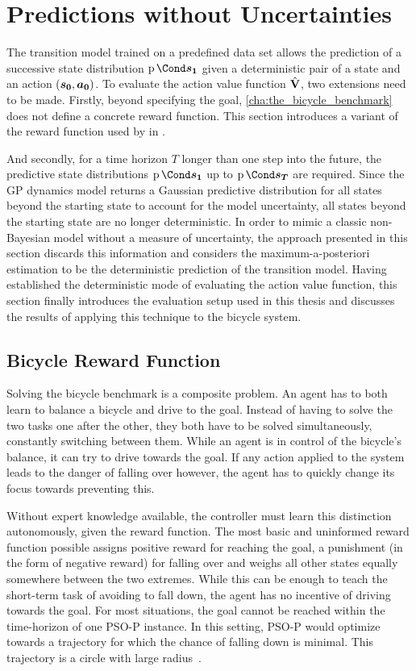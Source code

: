 \section{Predictions without Uncertainties}
The transition model trained on a predefined data set allows the prediction of a successive state distribution $\Prob{\mat{s_1}}$ given a deterministic pair of a state and an action $(\bm{s_0}, \bm{a_0})$.
To evaluate the action value function $\operatorname{\hat{\operatorname{\mathbf{V}}}}$, two extensions need to be made.
Firstly, beyond specifying the goal, \cref{cha:the_bicycle_benchmark} does not define a concrete reward function.
This section introduces a variant of the reward function used by \citeauthor{randlov_learning_1998} in \cite{randlov_learning_1998}.

And secondly, for a time horizon $T$ longer than one step into the future, the predictive state distributions $\Prob{\mat{s_1}}$ up to $\Prob{\mat{s_T}}$ are required.
Since the GP dynamics model returns a Gaussian predictive distribution for all states beyond the starting state to account for the model uncertainty, all states beyond the starting state are no longer deterministic.
In order to mimic a classic non-Bayesian model without a measure of uncertainty, the approach presented in this section discards this information and considers the maximum-a-posteriori estimation to be the deterministic prediction of the transition model.
Having established the deterministic mode of evaluating the action value function, this section finally introduces the evaluation setup used in this thesis and discusses the results of applying this technique to the bicycle system.

\subsection{Bicycle Reward Function}
\label{sub:reward_function}
Solving the bicycle benchmark is a composite problem.
An agent has to both learn to balance a bicycle and drive to the goal.
Instead of having to solve the two tasks one after the other, they both have to be solved simultaneously, constantly switching between them.
While an agent is in control of the bicycle's balance, it can try to drive towards the goal.
If any action applied to the system leads to the danger of falling over however, the agent has to quickly change its focus towards preventing this.

Without expert knowledge available, the controller must learn this distinction autonomously, given the reward function.
The most basic and uninformed reward function possible assigns positive reward for reaching the goal, a punishment (in the form of negative reward) for falling over and weighs all other states equally somewhere between the two extremes.
While this can be enough to teach the short-term task of avoiding to fall down, the agent has no incentive of driving towards the goal.
For most situations, the goal cannot be reached within the time-horizon of one PSO-P instance.
In this setting, PSO-P would optimize towards a trajectory for which the chance of falling down is minimal.
This trajectory is a circle with large radius~\cite{randlov_learning_1998}.

